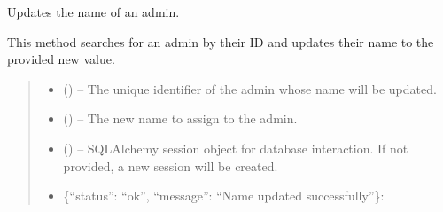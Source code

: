 \documentclass[letterpaper,10pt,english]{sphinxmanual}
\begin{document}
\begin{fulllineitems}
\begin{fulllineitems}
\begin{quote}
\begin{description}
\begin{itemize}
\end{itemize}

\end{description}\end{quote}

\end{fulllineitems}


\begin{fulllineitems}
\label{\detokenize{app.controllers:app.controllers.admin_controller.AdminController.updateAdminName}}
\pysigstartsignatures
\pysiglinewithargsret
{}
{\sphinxparamcomma {}\sphinxparamcomma {}}
{}
\pysigstopsignatures
\sphinxAtStartPar
Updates the name of an admin.

\sphinxAtStartPar
This method searches for an admin by their ID and updates their name to the provided new value.
\begin{quote}\begin{description}
\begin{itemize}
\item {} 
\sphinxAtStartPar
{} () – The unique identifier of the admin whose name will be updated.

\item {} 
\sphinxAtStartPar
{} () – The new name to assign to the admin.

\item {} 
\sphinxAtStartPar
{} (\sphinxstyleliteralemphasis{\sphinxupquote{, }}) – SQLAlchemy session object for database interaction.
If not provided, a new session will be created.

\end{itemize}

\sphinxAtStartPar
\begin{description}
\begin{itemize}
\item {} 
\sphinxAtStartPar
\{“status”: “ok”, “message”: “Name updated successfully”\}:


\end{itemize}
\end{description}
\end{description}
\end{quote}
\end{fulllineitems}
\end{fulllineitems}
\end{document}
